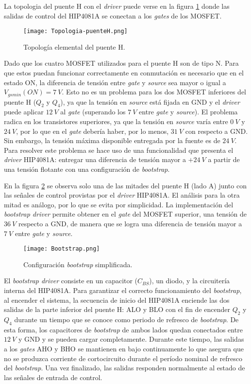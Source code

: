 La topologia del puente H con el \textsl{driver} puede verse en la figura \ref{fig:img_topologia-puenteH} donde las salidas de control del HIP4081A se conectan a los \textsl{gates} de los MOSFET.

\begin{figure}[H]
	\centering
	\texttt{[image: Topologia-puenteH.png]}
	\caption{Topología elemental del puente H.}
	\label{fig:img_topologia-puenteH}
\end{figure}


Dado que los cuatro MOSFET utilizados para el puente H son de tipo N. Para que estos puedan funcionar correctamente en conmutación es necesario que en el estado ON, la diferencia de tensión entre \textsl{gate} y \textsl{source} sea mayor o igual a $V_{gs min}(ON) = 7\:V$. Esto no es un problema para los dos MOSFET inferiores del puente H ($Q_2$ y $Q_4$), ya que la tensión en \textsl{source} está fijada en GND y el \textsl{driver} puede aplicar $12\:V$ al \textsl{gate} (superando los $7\:V$ entre \textsl{gate} y \textsl{source}). El problema radica en los transistores superiores, ya que la tensión en \textsl{source} varía entre $0\:V$ y $24\:V$, por lo que en el \textsl{gate} debería haber, por lo menos, $31\:V$ con respecto a GND. Sin embargo, la tensión máxima disponible entregada por la fuente es de $24\:V$. Para resolver este problema se hace uso de una funcionalidad que presenta el \textsl{driver} HIP4081A: entregar una diferencia de tensión mayor a $+24\:V$ a partir de una tensión flotante con una configuración de \textsl{bootstrap}.

En la figura \ref{fig:img_bootstrap} se observa solo una de las mitades del puente H (lado A) junto con las señales de control provistas por el \textsl{driver} HIP4081A.  El análisis para la otra mitad es análogo, por lo que se evita por simplicidad. La implementación del \textsl{bootstrap driver} permite obtener en el \textsl{gate} del MOSFET superior, una tensión de $36\:V$ respecto a GND, de manera que se logra una diferencia de tensión mayor a $7\:V$ entre \textsl{gate} y \textsl{source}. 


\begin{figure}[H]
	\centering
	\texttt{[image: Bootstrap.png]}
	\caption{Configuración \textsl{bootstrap} simplificada.}
	\label{fig:img_bootstrap}
\end{figure}

El \textsl{bootstrap driver} consiste en un capacitor ($C_{BS}$), un diodo, y la circuitería interna del HIP4081A. Para garantizar el correcto funcionamiento del \textsl{bootstrap}, al encender el sistema, la secuencia de inicio del HIP4081A enciende las dos salidas de la parte inferior del puente H: ALO y BLO con el fin de encender $Q_2$ y $Q_4$ durante un tiempo que se conoce como periodo de refresco de \textsl{bootstrap}. De esta forma, los capacitores de \textsl{bootstrap} de ambos lados quedan conectados entre $12\:V$ y GND y se pueden cargar completamente. Durante este tiempo, las salidas a los \textsl{gates} AHO y BHO se mantienen en bajo continuamente lo que asegura que no se produzca corriente de cortocircuito durante el período nominal de refresco del \textsl{bootstrap}. Una vez finalizado, las salidas responden normalmente al estado de las señales de entrada de control.


